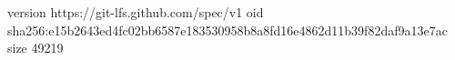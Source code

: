 version https://git-lfs.github.com/spec/v1
oid sha256:e15b2643ed4fc02bb6587e183530958b8a8fd16e4862d11b39f82daf9a13e7ac
size 49219
